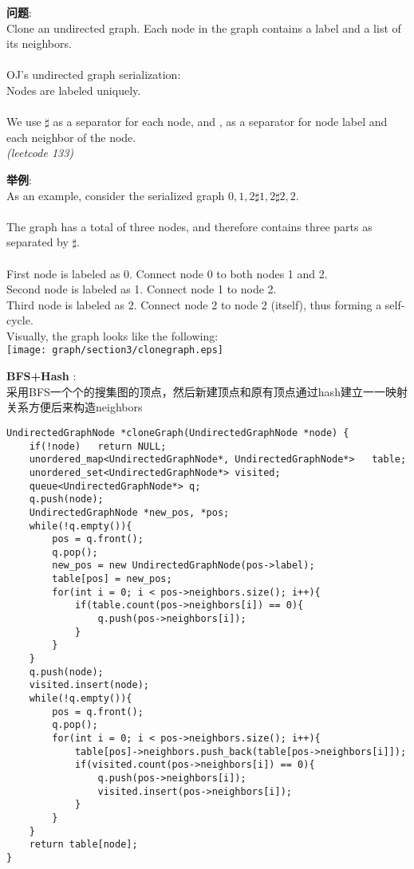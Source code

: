     
\begin{description}
    \item{\textbf{问题}}:\\
Clone an undirected graph. Each node in the graph contains a label and a list of its neighbors.\\
\\
OJ's undirected graph serialization:\\
Nodes are labeled uniquely.\\
\\
We use $ \sharp $ as a separator for each node, and , as a separator for node label and each neighbor of the node.\\
\textit{(leetcode 133)}
    \item{\textbf{举例}}:\\
As an example, consider the serialized graph ${0,1,2\sharp1,2\sharp2,2}$.\\
\\
The graph has a total of three nodes, and therefore contains three parts as separated by $\sharp$.\\
\\
First node is labeled as 0. Connect node 0 to both nodes 1 and 2.\\
Second node is labeled as 1. Connect node 1 to node 2.\\
Third node is labeled as 2. Connect node 2 to node 2 (itself), thus forming a self-cycle.\\
Visually, the graph looks like the following:\\
\texttt{[image: graph/section3/clonegraph.eps]}
    \item{\textbf{BFS+Hash}} : 
    \\采用BFS一个个的搜集图的顶点，然后新建顶点和原有顶点通过hash建立一一映射关系方便后来构造neighbors
    \begin{lstlisting}
UndirectedGraphNode *cloneGraph(UndirectedGraphNode *node) {
	if(!node)	return NULL;
	unordered_map<UndirectedGraphNode*, UndirectedGraphNode*>	table;
	unordered_set<UndirectedGraphNode*> visited;
	queue<UndirectedGraphNode*> q;
	q.push(node);
	UndirectedGraphNode *new_pos, *pos;
	while(!q.empty()){
		pos = q.front();
		q.pop();
		new_pos = new UndirectedGraphNode(pos->label);
		table[pos] = new_pos;
		for(int i = 0; i < pos->neighbors.size(); i++){
			if(table.count(pos->neighbors[i]) == 0){
				q.push(pos->neighbors[i]);
			}
		}
	}
	q.push(node);
	visited.insert(node);
	while(!q.empty()){
		pos = q.front();
		q.pop();
		for(int i = 0; i < pos->neighbors.size(); i++){
			table[pos]->neighbors.push_back(table[pos->neighbors[i]]);
			if(visited.count(pos->neighbors[i]) == 0){
				q.push(pos->neighbors[i]);
				visited.insert(pos->neighbors[i]);
			}
		}
	}
	return table[node];
}
    \end{lstlisting}
\end{description}
